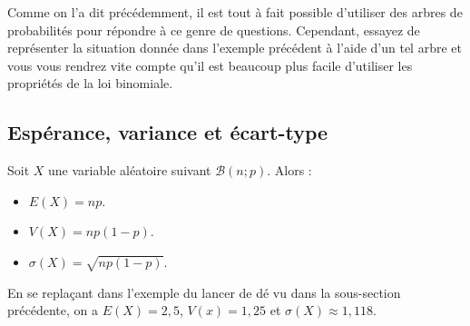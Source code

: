 	Comme on l'a dit précédemment, il est tout à fait possible d'utiliser des arbres de probabilités pour répondre à ce genre de questions. Cependant, essayez de représenter la situation donnée dans l'exemple précédent à l'aide d'un tel arbre et vous vous rendrez vite compte qu'il est beaucoup plus facile d'utiliser les propriétés de la loi binomiale.

	\subsection{Espérance, variance et écart-type}

	\begin{formula}
		Soit $X$ une variable aléatoire suivant $\mathcal{B}(n; p)$. Alors :
		\begin{itemize}
			\item $E(X) = np$.
			\item $V(X) = np(1-p)$.
			\item $\sigma(X) = \sqrt{np(1-p)}$.
		\end{itemize}
	\end{formula}

	\begin{tip}[Exemple]
		En se replaçant dans l'exemple du lancer de dé vu dans la sous-section précédente, on a $E(X) = 2,5$, $V(x) = 1,25$ et $\sigma(X) \approx 1,118$.
	\end{tip}

